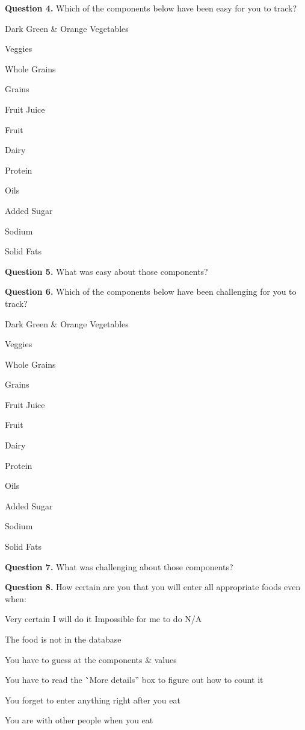 \noindent\textbf{Question 4.}
Which of the components below have been easy for you to track? 

\begin{itemize*}
\item	Dark Green \& Orange Vegetables
\item	Veggies
\item	Whole Grains
\item	Grains
\item	Fruit Juice
\item	Fruit
\item	Dairy
\item	Protein
\item	Oils
\item	Added Sugar
\item	Sodium
\item	Solid Fats
\end{itemize*}


\noindent\textbf{Question 5.}
What was easy about those components?  
 

\noindent\textbf{Question 6.}
Which of the components below have been challenging for you to track? 

\begin{itemize*}
\item	Dark Green \& Orange Vegetables
\item	Veggies
\item	Whole Grains
\item	Grains
\item	Fruit Juice
\item	Fruit
\item	Dairy
\item	Protein
\item	Oils
\item	Added Sugar
\item	Sodium
\item	Solid Fats
\end{itemize*}
\noindent\textbf{Question 7.}
What was challenging about those components?  
 

\noindent\textbf{Question 8.}
How certain are you that you will enter all appropriate foods even when: 

 	Very certain I will do it			Impossible for me to do	N/A
\begin{itemize*}
\item The food is not in the database	
\item You have to guess at the components \& values	
\item You have to read the \``More details'' box to figure out how to count it	
\item You forget to enter anything right after you eat	
\item You are with other people when you eat
\end{itemize*}

